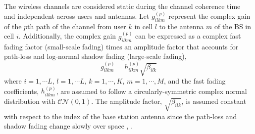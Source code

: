 \documentclass[journal,12pt,onecolumn]{IEEEtran}
\begin{document}
The wireless channels are considered static during the channel coherence time and independent across users and antennas. Let $g_{ilkm}^{(p)}$ represent the complex gain of the $p$th path of the channel from user $k$ in cell $l$ to the antenna $m$ of the BS in cell $i$. Additionally, the complex gain $g_{ilkm}^{(p)}$ can be expressed as a complex fast fading factor (small-scale fading) times an amplitude factor that accounts for path-loss and log-normal shadow fading (large-scale fading),
\begin{equation}
g_{ilkm}^{(p)} = h_{ilkm}^{(p)}\sqrt{\beta_{ilk}}
\end{equation}
where  $i = 1, \cdots L$, $l = 1, \cdots L$, $k = 1, \cdots, K$, $m = 1, \cdots, M$, and the fast fading coefficients, $h_{ilkm}^{(p)}$, are assumed to follow a circularly-symmetric complex normal distribution with $\mathcal{CN}(0,1)$. The amplitude factor, $\sqrt{\beta_{ilk}}$, is assumed constant with respect to the index of the base station
antenna since the path-loss and shadow fading change slowly
over space \cite{marzetta:noncooperative},  \cite{sklar:rayleigh_channels,tranter:principles}. 
\end{document}
